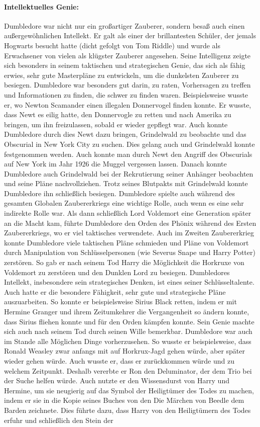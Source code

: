 \documentclass[a4paper, 10pt]{article}
\begin{document}
\paragraph{Intellektuelles Genie:}
Dumbledore war nicht nur ein großartiger Zauberer, sondern besaß auch einen außergewöhnlichen Intellekt. Er galt als einer der brillantesten Schüler, der jemals Hogwarts besucht hatte (dicht gefolgt von Tom Riddle) und wurde als Erwachsener von vielen als klügster Zauberer angesehen. Seine Intelligenz zeigte sich besonders in seinem taktischen und strategischen Genie, das sich als fähig erwies, sehr gute Masterpläne zu entwickeln, um die dunkelsten Zauberer zu besiegen. Dumbledore war besonders gut darin, zu raten, Vorhersagen zu treffen und Informationen zu finden, die schwer zu finden waren. Beispielsweise wusste er, wo Newton Scamander einen illegalen Donnervogel finden konnte. Er wusste, dass Newt es eilig hatte, den Donnervogle zu retten und nach Amerika zu bringen, um ihn freizulassen, sobald er wieder gepflegt war. Auch konnte Dumbledore durch dies Newt dazu bringen, Grindelwald zu beobachte und das Obscurial in New York City zu suchen. Dies gelang auch und Grindelwald konnte festgenommen werden. Auch konnte man durch Newt den Angriff des Obscurials auf New York im Jahr 1926 die Muggel vergessen lassen. Danach konnte Dumbledore auch Grindelwald bei der Rekrutierung seiner Anhänger beobachten und seine Pläne nachvollziehen. Trotz seines Blutpakts mit Grindelwald konnte Dumbledore ihn schließlich besiegen. Dumbledore spielte auch während des gesamten Globalen Zaubererkriegs eine wichtige Rolle, auch wenn es eine sehr indirekte Rolle war. Als dann schließlich Lord Voldemort eine Generation später an die Macht kam, führte Dumbledore den Orden des Phönix während des Ersten Zaubererkriegs, wo er viel taktisches verwendete. Auch im Zweiten Zaubererkrieg konnte Dumbledore viele taktischen Pläne schmieden und Pläne von Voldemort durch Manipulation von Schlüsselpersonen (wie Severus Snape und Harry Potter) zerstören. So gab er nach seinem Tod Harry die Möglichkeit die Horkruxe von Voldemort zu zerstören und den Dunklen Lord zu besiegen. Dumbledores Intellekt, insbesondere sein strategisches Denken, ist eines seiner Schlüsseltalente. Auch hatte er die besondere Fähigkeit, sehr gute und strategische Pläne auszuarbeiten. So konnte er beispielsweise Sirius Black retten, indem er mit Hermine Granger und ihrem Zeitumkehrer die Vergangenheit so ändern konnte, dass Sirius fliehen konnte und für den Orden kämpfen konnte. Sein Genie machte sich auch nach seinem Tod durch seinen Wille bemerkbar. Dumbledore war auch im Stande alle Möglichen Dinge vorherzusehen. So wusste er beispielsweise, dass Ronald Weasley zwar anfangs mit auf Horkrux-Jagd gehen würde, aber später wieder gehen würde. Auch wusste er, dass er zurückkommen würde und zu welchem Zeitpunkt. Deshalb vererbte er Ron den Deluminator, der dem Trio bei der Suche helfen würde. Auch nutzte er den Wissensdurst von Harry und Hermine, um sie neugierig auf das Symbol der Heiligtümer des Todes zu machen, indem er sie in die Kopie seines Buches von den Die Märchen von Beedle dem Barden zeichnete. Dies führte dazu, dass Harry von den Heiligtümern des Todes erfuhr und schließlich den Stein der 
\end{document}
